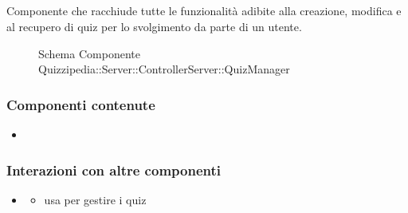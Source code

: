 \subsection{}
Componente che racchiude tutte le funzionalità adibite alla creazione, modifica e al recupero di quiz per lo svolgimento da parte di un utente.
\begin{figure}[H]
\centering
\noindent{}
\caption[Schema Componente Quizzipedia::Server::ControllerServer::QuizManager]{Schema Componente Quizzipedia::Server::ControllerServer::QuizManager}
\end{figure}
\subsubsection{Componenti contenute}
\begin{itemize}
\item {}
\end{itemize}
\subsubsection{Interazioni con altre componenti}
\begin{itemize}
\item {}
\begin{itemize}
\item usa  per gestire i quiz
\end{itemize}
\end{itemize}
